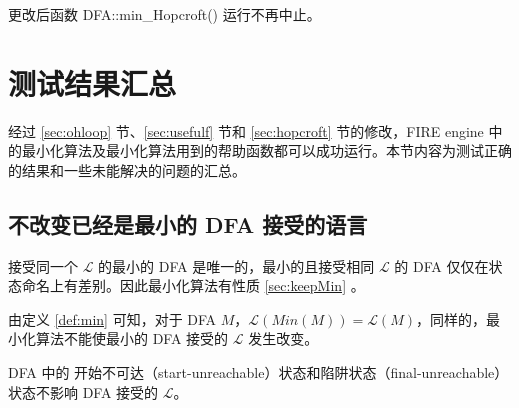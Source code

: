 更改后函数 DFA::min\_Hopcroft() 运行不再中止。

\section{测试结果汇总}\label{sec:listall}

经过 \ref{sec:ohloop} 节、\ref{sec:usefulf} 节和 \ref{sec:hopcroft} 节的修改，FIRE engine 中的最小化算法及最小化算法用到的帮助函数都可以成功运行。本节内容为测试正确的结果和一些未能解决的问题的汇总。

\subsection{不改变已经是最小的 DFA 接受的语言}

接受同一个 $\mathcal{L}$ 的最小的 DFA 是唯一的，最小的且接受相同 $\mathcal{L}$ 的 DFA 仅仅在状态命名上有差别\cite{book1}。因此最小化算法有性质 \ref{sec:keepMin} 。

\begin{property}\label{sec:keepMin}
    由定义 \ref{def:min} 可知，对于 DFA $M$，$\mathcal{L}(Min(M))= \mathcal{L}(M)$，同样的，最小化算法不能使最小的 DFA 接受的 $\mathcal{L}$ 发生改变。
\end{property}

\begin{remark}
    DFA 中的 开始不可达（start-unreachable）状态和陷阱状态（final-unreachable）状态不影响 DFA 接受的 $\mathcal{L}$。
\end{remark}



